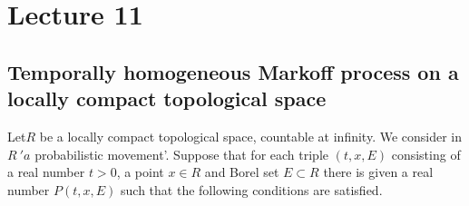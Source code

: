 \chapter{Lecture 11}\label{chap11} %

\section[Temporally homogeneous Markoff...]{Temporally homogeneous Markoff process on a locally compact
 topological space}\label{chap11:sec1} 

Let\pageoriginale $R$ be a locally compact topological space, countable at
infinity. We consider in $R~ {}'a$ probabilistic movement'. Suppose that
for each triple $(t, x, E)$ consisting of a real number $t > 0$, a
point $x \in R$ and Borel set $E \subset R$ there is given a real
number $P (t, x, E)$ such that the following conditions are
satisfied. 

